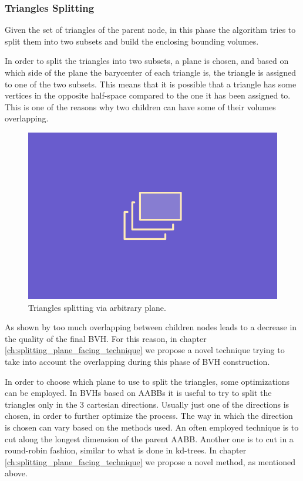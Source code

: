\documentclass{PoliMi_MasterThesis}
\begin{document}
\subsubsection*{Triangles Splitting} \label{ssec:triangles_splitting}
Given the set of triangles of the parent node, in this phase the algorithm tries to split them into two subsets and build the enclosing bounding volumes.

In order to split the triangles into two subsets, a plane is chosen, and based on which side of the plane the barycenter of each triangle is, the triangle is assigned to one of the two subsets. This means that it is possible that a triangle has some vertices in the opposite half-space compared to the one it has been assigned to. This is one of the reasons why two children can have some of their volumes overlapping. 

\begin{figure}[H]
    \centering
    \includegraphics[scale=0.4]{Images/TODO.png}
    \caption{Triangles splitting via arbitrary plane.}
    \label{fig:triangles_splitting}
\end{figure}

As shown by \cite{bvh_overlapping_metric} too much overlapping between children nodes leads to a decrease in the quality of the final BVH. For this reason, in chapter \ref{ch:splitting_plane_facing_technique} we propose a novel technique trying to take into account the overlapping during this phase of BVH construction.

In order to choose which plane to use to split the triangles, some optimizations can be employed. In BVHs based on AABBs it is useful to try to split the triangles only in the 3 cartesian directions. Usually just one of the directions is chosen, in order to further optimize the process. The way in which the direction is chosen can vary based on the methods used. An often employed technique is to cut along the longest dimension of the parent AABB. Another one is to cut in a round-robin fashion, similar to what is done in kd-trees. In chapter \ref{ch:splitting_plane_facing_technique} we propose a novel method, as mentioned above.
\end{document}
